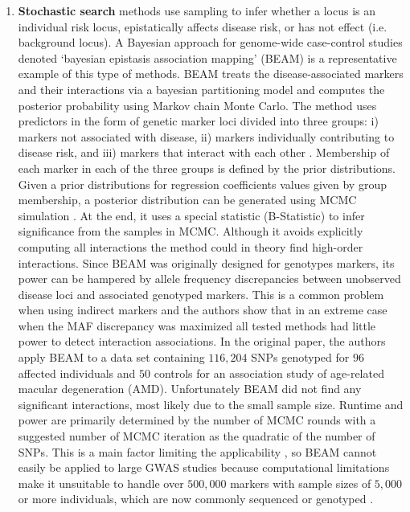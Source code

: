 \begin{enumerate}
	\item \textbf{Stochastic search} methods use sampling to infer whether a locus is an individual risk locus, epistatically affects disease risk, or has not effect (i.e. background locus).
A Bayesian approach for genome-wide case-control studies denoted `bayesian epistasis association mapping' (BEAM) \cite{zhang2007bayesian} is a representative example of this type of methods.
BEAM treats the disease-associated markers and their interactions via a bayesian partitioning model and computes the posterior probability using Markov chain Monte Carlo.
The method uses predictors in the form of genetic marker loci divided into three groups: 
i) markers not associated with disease, 
ii) markers individually contributing to disease risk, and 
iii) markers that interact with each other \cite{zhang2007bayesian}.
Membership of each marker in each of the three groups is defined by the prior distributions.
Given a prior distributions for regression coefficients values given by group membership, a posterior distribution can be generated using MCMC simulation \cite{cordell2009detecting}.
At the end, it uses a special statistic (B-Statistic) to infer significance from the samples in MCMC. 
Although it avoids explicitly computing all interactions the method could in theory find high-order interactions. 
Since BEAM was originally designed for genotypes markers, its power can be hampered by allele frequency discrepancies between unobserved disease loci and associated genotyped markers.
This is a common problem when using indirect markers and the authors show that in an extreme case when the MAF discrepancy was maximized all tested methods had little power to detect interaction associations.
In the original paper, the authors apply BEAM to a data set containing $116,204$ SNPs genotyped for $96$ affected individuals and $50$ controls for an association study of age-related macular degeneration (AMD).
Unfortunately BEAM did not find any significant interactions, most likely due to the small sample size.
Runtime and power are primarily determined by the number of MCMC rounds with a suggested number of MCMC iteration as the quadratic of the number of SNPs.
This is a main factor limiting the applicability \cite{li2011detecting}, so BEAM cannot easily be applied to large GWAS studies because computational limitations make it unsuitable to handle over $500,000$ markers with sample sizes of $5,000$ or more individuals, which are now commonly sequenced or genotyped \cite{cordell2009detecting}.


\end{enumerate}
